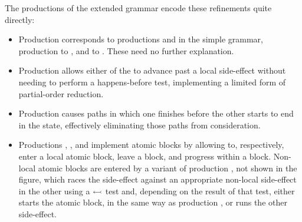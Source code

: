 The productions of the extended grammar encode these refinements quite
directly:
\begin{itemize}
\item Production  corresponds to productions
   and  in the simple grammar,
  production  to , and  to
  .  These need no further explanation.
\item Production  allows either of the {\StateMachines}
  to advance past a local side-effect without needing to perform a
  happens-before test, implementing a limited form of partial-order
  reduction.
\item Production  causes paths in which one
  {\StateMachine} finishes before the other starts to end in the
  {\stUnreached} state, effectively eliminating those paths from
  consideration.
\item Productions , , and
   implement atomic blocks by allowing {\StateMachines}
  to, respectively, enter a local atomic block, leave a block, and
  progress within a block.  Non-local atomic blocks are entered by a
  variant of production , not shown in the figure,
  which races the {\stStartAtomic} side-effect against an appropriate
  non-local side-effect in the other {\StateMachine} using a
  $\leftarrowtail$ test and, depending on the result of that test,
  either starts the atomic block, in the same way as production
  , or runs the other side-effect.
\end{itemize}
